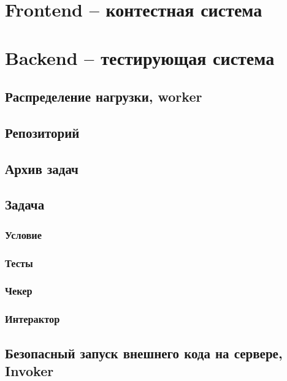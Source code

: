\chapter{Frontend -- контестная система}

\chapter{Backend -- тестирующая система}

\section{Распределение нагрузки, worker}

\section{Репозиторий}

\section{Архив задач}

\section{Задача}

\subsection{}

\subsection{Условие}

\subsection{Тесты}

\subsection{Чекер}

\subsection{Интерактор}

\section{Безопасный запуск внешнего кода на сервере, Invoker}
